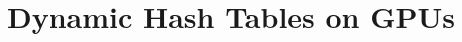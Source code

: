 \documentclass[10pt,sigconf]{acmart}
\begin{document}
\title{Dynamic Hash Tables on GPUs}


\begin{abstract}
\end{abstract}

\maketitle














\end{document}
